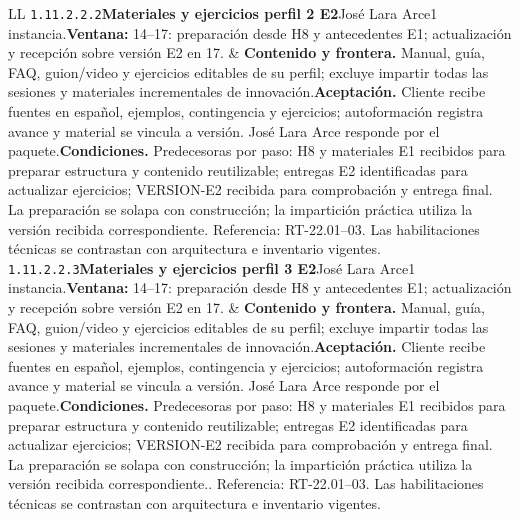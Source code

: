 \begin{longtable}{L{\tabcolsep\relax}L{\tabcolsep\relax}}
\texttt{1.\allowbreak{}11.\allowbreak{}2.\allowbreak{}2.\allowbreak{}2}\newline{}\textbf{Materiales y ejercicios perfil 2 E2}\newline{}José Lara Arce\newline{}1 instancia.\newline{}\textbf{Ventana:} 14--17: preparación desde H8 y antecedentes E1; actualización y recepción sobre versión E2 en 17. & \textbf{Contenido y frontera.} Manual, guía, FAQ, guion/video y ejercicios editables de su perfil; excluye impartir todas las sesiones y materiales incrementales de innovación.\newline{}\textbf{Aceptación.} Cliente recibe fuentes en español, ejemplos, contingencia y ejercicios; autoformación registra avance y material se vincula a versión. José Lara Arce responde por el paquete.\newline{}\textbf{Condiciones.} Predecesoras por paso: H8 y materiales E1 recibidos para preparar estructura y contenido reutilizable; entregas E2 identificadas para actualizar ejercicios; VERSION-E2 recibida para comprobación y entrega final. La preparación se solapa con construcción; la impartición práctica utiliza la versión recibida correspondiente. Referencia: RT-22.01--03. Las habilitaciones técnicas se contrastan con arquitectura e inventario vigentes.\\\hline
\texttt{1.\allowbreak{}11.\allowbreak{}2.\allowbreak{}2.\allowbreak{}3}\newline{}\textbf{Materiales y ejercicios perfil 3 E2}\newline{}José Lara Arce\newline{}1 instancia.\newline{}\textbf{Ventana:} 14--17: preparación desde H8 y antecedentes E1; actualización y recepción sobre versión E2 en 17. & \textbf{Contenido y frontera.} Manual, guía, FAQ, guion/video y ejercicios editables de su perfil; excluye impartir todas las sesiones y materiales incrementales de innovación.\newline{}\textbf{Aceptación.} Cliente recibe fuentes en español, ejemplos, contingencia y ejercicios; autoformación registra avance y material se vincula a versión. José Lara Arce responde por el paquete.\newline{}\textbf{Condiciones.} Predecesoras por paso: H8 y materiales E1 recibidos para preparar estructura y contenido reutilizable; entregas E2 identificadas para actualizar ejercicios; VERSION-E2 recibida para comprobación y entrega final. La preparación se solapa con construcción; la impartición práctica utiliza la versión recibida correspondiente.. Referencia: RT-22.01--03. Las habilitaciones técnicas se contrastan con arquitectura e inventario vigentes.\\\hline

\end{longtable}
